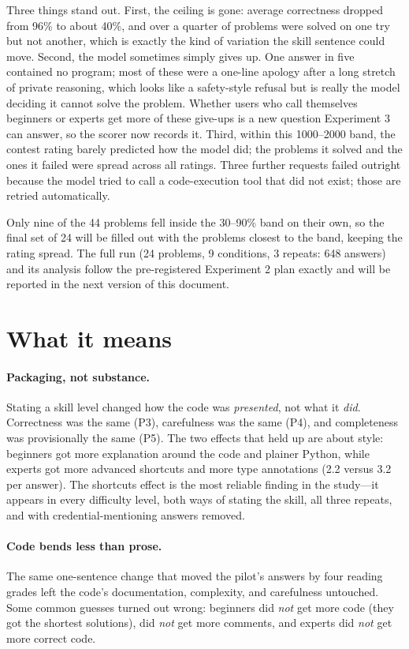 \documentclass[11pt,a4paper]{article}
\begin{document}
Three things stand out. First, the ceiling is gone: average correctness dropped from 96\% to about 40\%, and over a quarter of problems were solved on one try but not another, which is exactly the kind of variation the skill sentence could move. Second, the model sometimes simply gives up. One answer in five contained no program; most of these were a one-line apology after a long stretch of private reasoning, which looks like a safety-style refusal but is really the model deciding it cannot solve the problem. Whether users who call themselves beginners or experts get more of these give-ups is a new question Experiment 3 can answer, so the scorer now records it. Third, within this 1000--2000 band, the contest rating barely predicted how the model did; the problems it solved and the ones it failed were spread across all ratings. Three further requests failed outright because the model tried to call a code-execution tool that did not exist; those are retried automatically.

Only nine of the 44 problems fell inside the 30--90\% band on their own, so the final set of 24 will be filled out with the problems closest to the band, keeping the rating spread. The full run (24 problems, 9 conditions, 3 repeats: 648 answers) and its analysis follow the pre-registered Experiment 2 plan exactly and will be reported in the next version of this document.

\section{What it means}

\paragraph{Packaging, not substance.} Stating a skill level changed how the code was \emph{presented}, not what it \emph{did}. Correctness was the same (P3), carefulness was the same (P4), and completeness was provisionally the same (P5). The two effects that held up are about style: beginners got more explanation around the code and plainer Python, while experts got more advanced shortcuts and more type annotations (2.2 versus 3.2 per answer). The shortcuts effect is the most reliable finding in the study---it appears in every difficulty level, both ways of stating the skill, all three repeats, and with credential-mentioning answers removed.

\paragraph{Code bends less than prose.} The same one-sentence change that moved the pilot's answers by four reading grades left the code's documentation, complexity, and carefulness untouched. Some common guesses turned out wrong: beginners did \emph{not} get more code (they got the shortest solutions), did \emph{not} get more comments, and experts did \emph{not} get more correct code.
\end{document}
